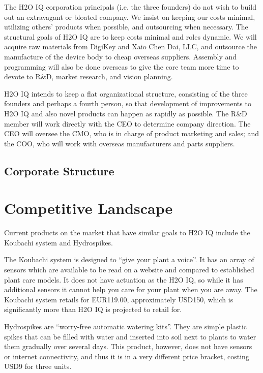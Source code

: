 \documentclass[11pt]{article}
\begin{document}
The H2O IQ corporation principals (i.e. the three founders) do not wish to build out an extravagant or bloated company.  We insist on keeping our costs minimal, utilizing others' products when possible, and outsourcing when necessary.  The structural goals of H2O IQ are to keep costs minimal and roles dynamic.  We will acquire raw materials from DigiKey and Xaio Chen Dai, LLC, and outsource the manufacture of the device body to cheap overseas suppliers.  Assembly and programming will also be done overseas to give the core team more time to devote to R\&D, market research, and vision planning.

H2O IQ intends to keep a flat organizational structure, consisting of the three founders and perhaps a fourth person, so that development of improvements to H2O IQ and also novel products can happen as rapidly as possible.  The R\&D member will work directly with the CEO to determine company direction.  The CEO will oversee the CMO, who is in charge of product marketing and sales; and the COO, who will work with overseas manufacturers and parts suppliers.

\subsection{Corporate Structure}

\section{Competitive Landscape}

Current products on the market that have similar goals to H2O IQ include the Koubachi system and Hydrospikes.

The Koubachi system is designed to ``give your plant a voice''.  It has an array of sensors which are available to be read on a website and compared to established plant care models.  It does not have actuation as the H2O IQ, so while it has additional sensors it cannot help you care for your plant when you are away.  The Koubachi system retails for EUR119.00, approximately USD150, which is significantly more than H2O IQ is projected to retail for.

Hydrospikes are ``worry-free automatic watering kits''.  They are simple plastic spikes that can be filled with water and inserted into soil next to plants to water them gradually over several days.  This product, however, does not have sensors or internet connectivity, and thus it is in a very different price bracket, costing USD9 for three units.
\end{document}
